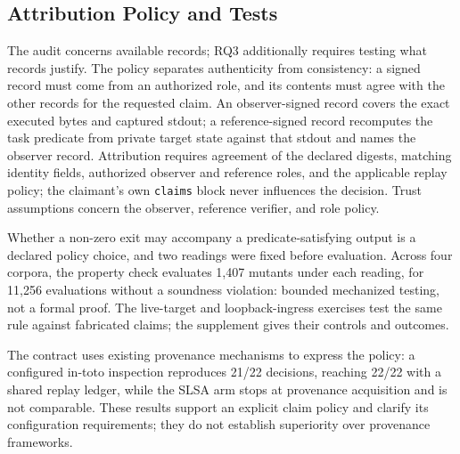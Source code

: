 \subsection{Attribution Policy and Tests}\label{sec:attribution-contract}
The audit concerns available records; RQ3 additionally requires testing what
records justify. The policy separates authenticity from consistency: a signed
record must come from an authorized role, and its contents must agree with
the other records for the requested claim. An observer-signed record
covers the exact executed bytes and captured stdout; a reference-signed record
recomputes the task predicate from private target state against that stdout and
names the observer record. Attribution requires agreement of the declared
digests, matching identity fields, authorized observer and reference roles, and
the applicable replay policy; the claimant's own \texttt{claims} block never
influences the decision. Trust assumptions concern the observer, reference
verifier, and role policy.

Whether a non-zero exit may accompany a predicate-satisfying output is a
declared policy choice, and two readings were fixed before evaluation. Across
four corpora, the property check evaluates 1{,}407 mutants under each reading,
for 11{,}256 evaluations without a soundness violation: bounded mechanized
testing, not a formal proof. The live-target and
loopback-ingress exercises test the same rule against fabricated claims; the
supplement gives their controls and outcomes.

The contract uses existing provenance mechanisms to express the policy: a
configured in-toto inspection reproduces 21/22 decisions, reaching 22/22 with a
shared replay ledger, while the SLSA arm stops at provenance acquisition and is
not comparable. These results support an explicit claim policy and clarify its
configuration requirements; they do not establish superiority over provenance
frameworks.
